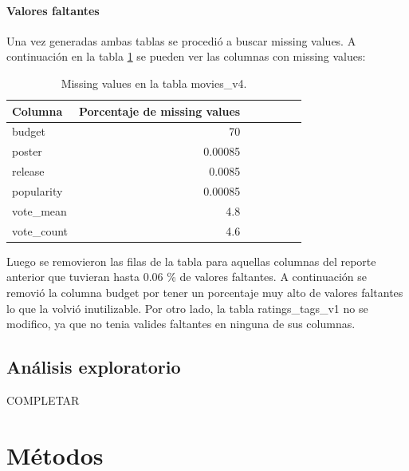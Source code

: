 \documentclass[11pt,a4paper,twoside]{thesis}
\begin{document}
\subsubsection*{Valores faltantes}

Una vez generadas ambas tablas se procedió a buscar missing values. A continuación en la tabla \ref{table:tab} 
se pueden ver las columnas con missing values:
\begin{table}[h!]
\centering
\footnotesize
\begin{tabular}{lrrrrrr}
\hline
Columna &  Porcentaje de missing values \\
\hline
   	budget     &  70      \\
   	poster     &  0.00085 \\
   	release    &  0.0085  \\
	popularity &  0.00085 \\
	vote\_mean  &  4.8     \\
	vote\_count &  4.6     \\
\hline
\end{tabular}
\caption{Missing values en la tabla movies\_v4.}
\label{table:tab}
\end{table}

Luego se removieron las filas de la tabla para aquellas columnas del reporte anterior que tuvieran hasta 0.06 \% de valores faltantes. A continuación se removió la columna budget por tener un porcentaje muy alto de valores faltantes lo que la volvió inutilizable. Por otro lado, la tabla ratings\_tags\_v1 no se modifico, ya que no tenia valides faltantes en ninguna de sus columnas.


\section{Análisis exploratorio}

COMPLETAR

\chapter{Métodos}
\end{document}
